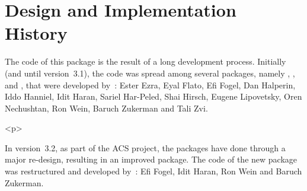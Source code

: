 
\section*{Design and Implementation History}
%
The code of this package is the result of a long development process.
Initially (and until version~3.1), the code was spread among several
packages, namely , ,
 and , that were
developed by~: \newline
Ester Ezra, Eyal Flato, Efi Fogel, Dan Halperin, Iddo Hanniel, Idit Haran,
Sariel Har-Peled, Shai Hirsch, Eugene Lipovetsky, Oren Nechushtan, Ron Wein,
Baruch Zukerman and Tali Zvi.

\begin{ccHtmlOnly}<p>\end{ccHtmlOnly}
In version~3.2, as part of the ACS project, the packages have done through
a major re-design, resulting in an improved  package.
The code of the new package was restructured and developed by~: \newline
Efi Fogel, Idit Haran, Ron Wein and Baruch Zukerman.
